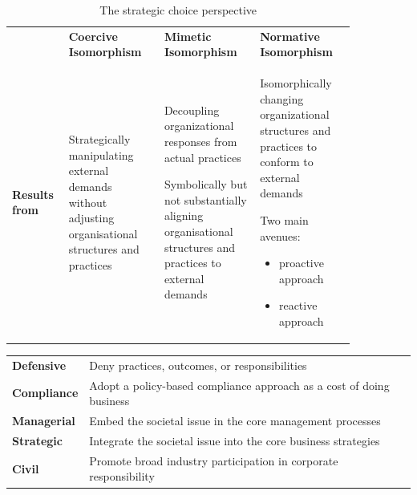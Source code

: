 \documentclass[11pt]{article}
\theoremstyle{definition}
\begin{document}
\begin{table}[H]
	\footnotesize
	\begin{tabularx}{\linewidth}{p{0.1\linewidth} p{0.25\linewidth} p{0.25\linewidth} p{0.25\linewidth}}
		\cellcolor{SteelBlue1!75} & \cellcolor{SteelBlue1!75} \textbf{Coercive Isomorphism} & \cellcolor{SteelBlue1!75} \textbf{Mimetic Isomorphism} & \cellcolor{SteelBlue1!75} \textbf{Normative Isomorphism}\\
		\textbf{Results from} & \begin{itemize}[
			left=0pt,
			nosep,
			before={\begin{minipage}[t]{\hsize}},
				after={\end{minipage}}
			]
			\item  Strategically manipulating external demands without adjusting organisational structures and practices
		\end{itemize} & \begin{itemize}[
			left=0pt,
			nosep,
			before={\begin{minipage}[t]{\hsize}},
				after={\end{minipage}}
			]
			\item Decoupling organizational responses from actual practices
			\item Symbolically but not substantially aligning organisational structures and practices to external demands
		\end{itemize} & \begin{itemize}[
			left=0pt,
			nosep,
			before={\begin{minipage}[t]{\hsize}},
				after={\end{minipage}}
			]
			\item Isomorphically changing organizational structures and practices to conform to external demands
			\item Two main avenues:
			\begin{itemize}[nosep, left=1em]
				\item proactive approach
				\item reactive approach
			\end{itemize}
		\end{itemize}
	\end{tabularx}
	\caption{The strategic choice perspective}
\end{table}

\begin{tabularx}{\linewidth}{l X}
	\textbf{Defensive} &  Deny practices, outcomes, or responsibilities\\
	\textbf{Compliance} & Adopt a policy-based compliance approach as a cost of doing business\\
	\textbf{Managerial} & Embed the societal issue in the core management processes\\
	\textbf{Strategic} & Integrate the societal issue into the core business strategies\\
	\textbf{Civil} & Promote broad industry participation in corporate responsibility
\end{tabularx}
\end{document}
